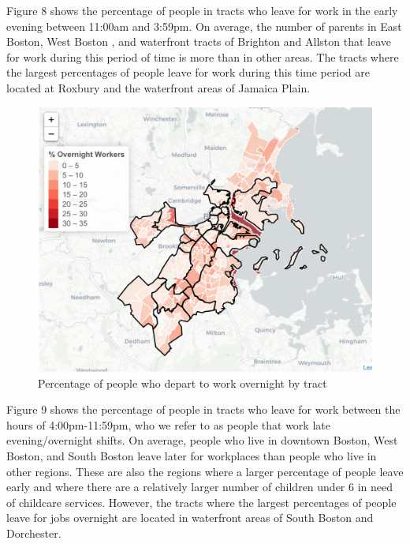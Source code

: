\documentclass[10pt,letterpaper]{article}
\begin{document}
Figure 8 shows the percentage of people in tracts who leave for work in
the early evening between 11:00am and 3:59pm. On average, the number of
parents in East Boston, West Boston , and waterfront tracts of Brighton
and Allston that leave for work during this period of time is more than
in other areas. The tracts where the largest percentages of people leave
for work during this time period are located at Roxbury and the
waterfront areas of Jamaica Plain.

\begin{figure}

{\centering \includegraphics[width=1\linewidth]{fig6_percent_overnight} 

}

\caption{Percentage of people who depart to work overnight by tract}\label{fig:unnamed-chunk-9}
\end{figure}

Figure 9 shows the percentage of people in tracts who leave for work
between the hours of 4:00pm-11:59pm, who we refer to as people that work
late evening/overnight shifts. On average, people who live in downtown
Boston, West Boston, and South Boston leave later for workplaces than
people who live in other regions. These are also the regions where a
larger percentage of people leave early and where there are a relatively
larger number of children under 6 in need of childcare services.
However, the tracts where the largest percentages of people leave for
jobs overnight are located in waterfront areas of South Boston and
Dorchester.
\end{document}
